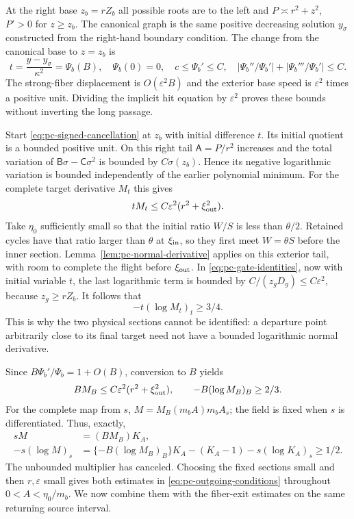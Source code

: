 At the right base $z_b=rZ_b$ all possible roots are to the left and
$P\asymp r^2+z^2$, $P'>0$ for $z\ge z_b$.
The canonical graph is the same positive decreasing solution
$y_\sigma$ constructed from the right-hand boundary condition.
The change from the canonical base to $z=z_b$ is
\[
 t=\frac{y-y_\sigma}{\kappa^2}=\Psi_b(B),\quad
 \Psi_b(0)=0,\quad c\le\Psi_b'\le C,\quad
 |\Psi_b''/\Psi_b'|+|\Psi_b'''/\Psi_b'|\le C.
\]
The strong-fiber displacement is $O(\varepsilon^2B)$ and the exterior
base speed is $\varepsilon^2$ times a positive unit. Dividing the
implicit hit equation by $\varepsilon^2$ proves these bounds without
inverting the long passage.

Start \eqref{eq:pc-signed-cancellation} at $z_b$ with initial
difference $t$. Its initial quotient is a bounded positive unit.
On this right tail $\mathsf A=P/r^2$ increases and the total variation
of $\mathsf B\sigma-\mathsf C\sigma^2$ is bounded by $C\sigma(z_b)$.
Hence its negative logarithmic variation is bounded independently of
the earlier polynomial minimum. For the complete target derivative
$M_t$ this gives
\[
 tM_t\le C\varepsilon^2(r^2+\xi_{\rm out}^2).
\]
Take $\eta_0$ sufficiently small so that the initial ratio $W/S$ is
less than $\theta/2$. Retained cycles have that ratio larger than
$\theta$ at $\xi_{\rm in}$, so they first meet $W=\theta S$
before the inner section. Lemma~\ref{lem:pc-normal-derivative} applies
on this exterior tail, with room to complete the flight before
$\xi_{\rm out}$. In \eqref{eq:pc-gate-identities}, now with initial
variable $t$, the last logarithmic term is bounded by
$C/(z_gD_g)\le C\varepsilon^2$, because $z_g\ge rZ_b$.
It follows that
\[
 -t(\log M_t)_t\ge3/4.
\]
This is why the two physical sections cannot be identified: a departure
point arbitrarily close to its final target need not have a bounded
logarithmic normal derivative.

Since $B\Psi_b'/\Psi_b=1+O(B)$, conversion to $B$ yields
\[
 BM_B\le C\varepsilon^2(r^2+\xi_{\rm out}^2),\qquad
 -B(\log M_B)_B\ge2/3.
\]
For the complete map from $s$, $M=M_B(m_bA)m_bA_s$; the field is
fixed when $s$ is differentiated. Thus, exactly,
\begin{align*}
 sM&=(BM_B)K_A,\\
 -s(\log M)_s
 &=\{-B(\log M_B)_B\}K_A-(K_A-1)-s(\log K_A)_s\ge1/2.
\end{align*}
The unbounded multiplier has canceled. Choosing the fixed sections
small and then $r,\varepsilon$ small gives both estimates in
\eqref{eq:pc-outgoing-conditions} throughout $0<A<\eta_0/m_b$.
We now combine them with the fiber-exit estimates on the same returning
source interval.


